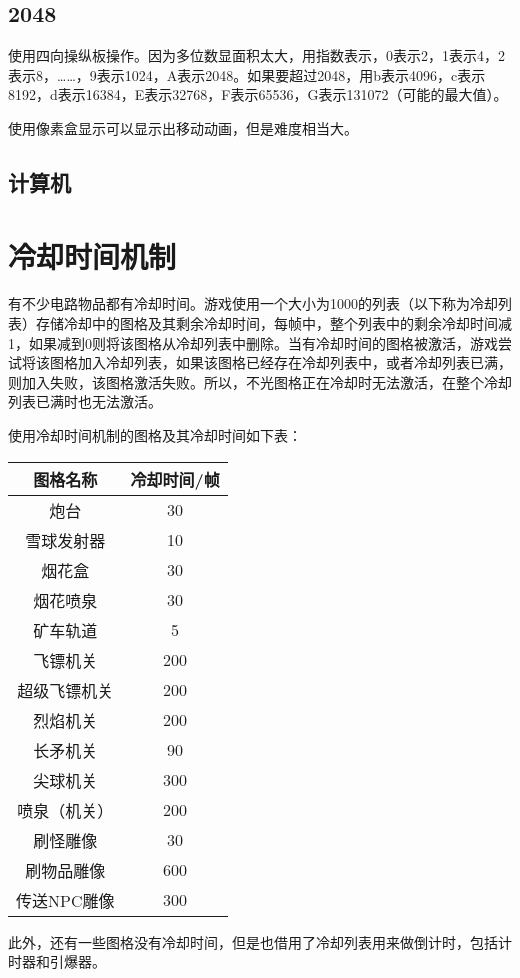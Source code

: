 \section{2048}
使用四向操纵板操作。因为多位数显面积太大，用指数表示，0表示2，1表示4，2表示8，……，9表示1024，A表示2048。如果要超过2048，用b表示4096，c表示8192，d表示16384，E表示32768，F表示65536，G表示131072（可能的最大值）。

使用像素盒显示可以显示出移动动画，但是难度相当大。

\section{计算机}

\chapter{冷却时间机制}
有不少电路物品都有冷却时间。游戏使用一个大小为1000的列表（以下称为冷却列表）存储冷却中的图格及其剩余冷却时间，每帧中，整个列表中的剩余冷却时间减1，如果减到0则将该图格从冷却列表中删除。当有冷却时间的图格被激活，游戏尝试将该图格加入冷却列表，如果该图格已经存在冷却列表中，或者冷却列表已满，则加入失败，该图格激活失败。所以，不光图格正在冷却时无法激活，在整个冷却列表已满时也无法激活。

使用冷却时间机制的图格及其冷却时间如下表：
\begin{table}[!h]
\centering
\begin{tabular}{c|c}
图格名称&冷却时间/帧\\\hline\hline
炮台&30\\\hline
雪球发射器&10\\\hline
烟花盒&30\\\hline
烟花喷泉&30\\\hline
矿车轨道&5\\\hline
飞镖机关&200\\\hline
超级飞镖机关&200\\\hline
烈焰机关&200\\\hline
长矛机关&90\\\hline
尖球机关&300\\\hline
喷泉（机关）&200\\\hline
刷怪雕像&30\\\hline
刷物品雕像&600\\\hline
传送NPC雕像&300\\\hline
\end{tabular}
\end{table}

此外，还有一些图格没有冷却时间，但是也借用了冷却列表用来做倒计时，包括计时器和引爆器。

